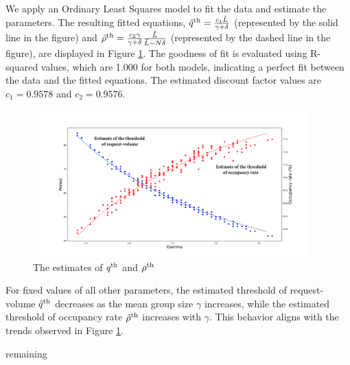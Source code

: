 We apply an Ordinary Least Squares model to fit the data and estimate the parameters. The resulting fitted equations, $\tilde{q}^{\textup{th}} = \frac{c_1 \tilde{L}}{\gamma + \delta}$ (represented by the solid line in the figure) and $\tilde{\rho}^{\textup{th}} = \frac{c_2 \gamma}{\gamma + \delta} \frac{\tilde{L}}{\tilde{L}-N \delta}$ (represented by the dashed line in the figure), are displayed in Figure \ref{esti_q}. The goodness of fit is evaluated using R-squared values, which are 1.000 for both models, indicating a perfect fit between the data and the fitted equations. The estimated discount factor values are $c_1 = 0.9578$ and $c_2 = 0.9576$.

\begin{figure}[ht]
  \caption{The estimates of $q^{\textup{th}}$ and $\rho^{\textup{th}}$}\label{esti_q}
  \centering
    \includegraphics[width=0.95\textwidth]{./Figures/200_random.pdf}
\end{figure}

For fixed values of all other parameters, the estimated threshold of request-volume $\tilde{q}^{\textup{th}}$ decreases as the mean group size $\gamma$ increases, while the estimated threshold of occupancy rate $\tilde{\rho}^{\textup{th}}$ increases with $\gamma$. This behavior aligns with the trends observed in Figure \ref{esti_q}.



{\color{blue} remaining}

